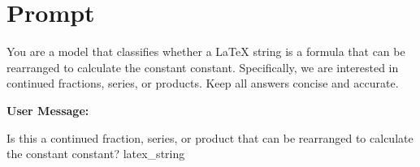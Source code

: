 \documentclass{article}
\begin{document}
\section*{Prompt}

\begin{tcolorbox}
You are a model that classifies whether a LaTeX string is a formula that can be rearranged to calculate the constant {constant}. 
Specifically, we are interested in continued fractions, series, or products. Keep all answers concise and accurate.
\end{tcolorbox}

\vspace{4mm} %

\noindent \textbf{User Message:}
\vspace{2mm} %

\begin{tcolorbox}
Is this a continued fraction, series, or product that can be rearranged to calculate the constant {constant}? {latex_string}
\end{tcolorbox}
\end{document}
